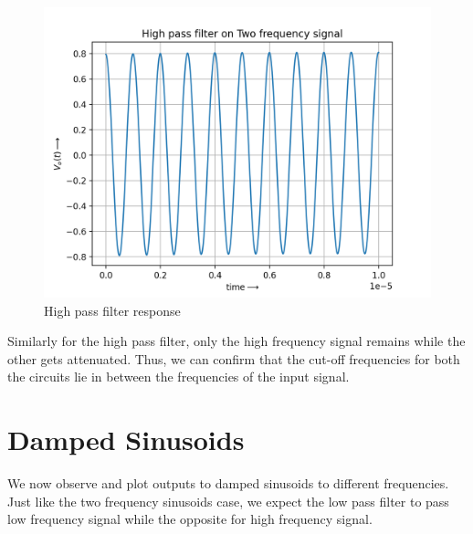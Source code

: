 \documentclass[11pt, a4paper]{article}
\begin{document}
\begin{figure}[!tbh]
   	\centering
   	\includegraphics[scale=0.5]{high_pass_tfs.png}   
   	\caption{High pass filter response}
   	\label{fig:Figure_1}
\end{figure}
Similarly for the high pass filter, only the high frequency signal remains while the other gets attenuated. Thus, we can confirm that the cut-off frequencies for both the circuits lie in between the frequencies of the input signal.

\section{Damped Sinusoids}
We now observe and plot outputs to damped sinusoids to different frequencies. Just like the two frequency sinusoids case, we expect the low pass filter to pass low frequency signal while the opposite for high frequency signal.
\end{document}
